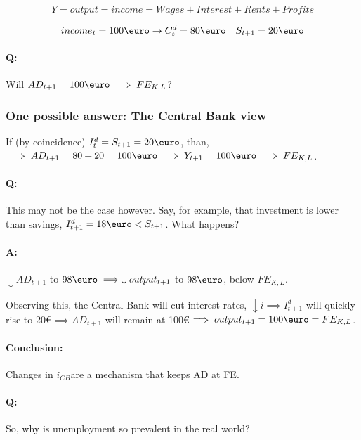 \documentclass{report}
\begin{document}
\begin{equation*}
    Y=output=income=Wages+Interest+Rents+Profits
\end{equation*}

\begin{equation*}
    income_t=100\text{\euro} \rightarrow C_t^d=80\text{\euro} \quad S_{t+1}=20\text{\euro}
\end{equation*}

\paragraph{Q:} Will $AD_{t+1}=100\text{\euro} \implies FE_{K,L}$?

\subsubsection{One possible answer: The Central Bank view}
If (by coincidence) $I_t^d=S_{t+1}=20\text{\euro}$, than, $ \implies AD_{t+1}=80+20=100\text{\euro}\implies Y_{t+1}=100\text{\euro} \implies FE_{K,L}$.

\paragraph{Q:} This may not be the case however. Say, for example, that investment is lower than savings, $I^d_{t+1}=18\text{\euro}<S_{t+1}$. What happens? 

\paragraph{A:} $\downarrow AD_{t+1}$ to $98 \text{\euro} \implies \downarrow output_{t+1}$ to $98\text{\euro}$, below $FE_{K,L}$.

Observing this, the Central Bank will cut interest rates, $\downarrow i \implies I^d_{t+1}$ will quickly rise to 20\euro $\implies AD_{t+1}$ will remain at 100\euro $\implies output_{t+1}=100\text{\euro}=FE_{K,L}$.

\paragraph{Conclusion:} Changes in $i_{CB}$are a mechanism that keeps AD at FE. 

\paragraph{Q:} So, why is unemployment so prevalent in the real world? 
\end{document}

